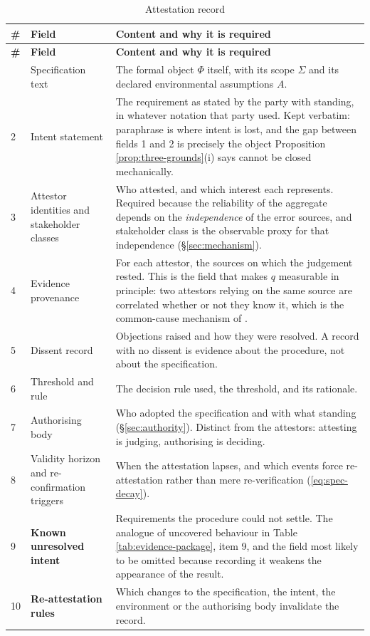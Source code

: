 \begin{center}
\small
\begin{longtable}{L{0.9cm}L{5.2cm}L{8.5cm}}
\caption{Attestation record}\label{tab:attestation}\\
\toprule
\textbf{\#} & \textbf{Field} & \textbf{Content and why it is required} \\
\midrule
\endfirsthead
\toprule
\textbf{\#} & \textbf{Field} & \textbf{Content and why it is required} \\
\midrule
\endhead
\bottomrule
{} & Specification text & The formal object $\Phi$ itself, with its scope $\Sigma$ and its declared
  environmental assumptions $A$. \\
2 & Intent statement & The requirement as stated by the party with standing, in whatever notation that
  party used. Kept verbatim: paraphrase is where intent is lost, and the gap between fields 1 and 2
  is precisely the object Proposition \ref{prop:three-grounds}(i) says cannot be closed
  mechanically. \\
3 & Attestor identities and stakeholder classes & Who attested, and which interest each
  represents. Required because the reliability of the aggregate depends on the \emph{independence}
  of the error sources, and stakeholder class is the observable proxy for that independence
  (\S\ref{sec:mechanism}). \\
4 & Evidence provenance & For each attestor, the sources on which the judgement rested. This is the
  field that makes $q$ measurable in principle: two attestors relying on the same source are
  correlated whether or not they know it, which is the common-cause mechanism of
  \cite{dietrich2004}. \\
5 & Dissent record & Objections raised and how they were resolved. A record with no dissent is
  evidence about the procedure, not about the specification. \\
6 & Threshold and rule & The decision rule used, the threshold, and its rationale. \\
7 & Authorising body & Who adopted the specification and with what standing
  (\S\ref{sec:authority}). Distinct from the attestors: attesting is judging, authorising is
  deciding. \\
8 & Validity horizon and re-confirmation triggers & When the attestation lapses, and which events
  force re-attestation rather than mere re-verification (\eqref{eq:spec-decay}). \\
9 & \textbf{Known unresolved intent} & Requirements the procedure could not settle. The analogue of
  uncovered behaviour in Table \ref{tab:evidence-package}, item 9, and the field most likely to be
  omitted because recording it weakens the appearance of the result. \\
10 & \textbf{Re-attestation rules} & Which changes to the specification, the intent, the
  environment or the authorising body invalidate the record. \\
\end{longtable}
\end{center}

